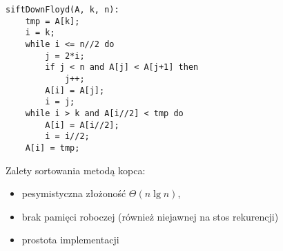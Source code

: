 \begin{verbatim}
siftDownFloyd(A, k, n):
    tmp = A[k];
    i = k;
    while i <= n//2 do
        j = 2*i;
        if j < n and A[j] < A[j+1] then
            j++;
        A[i] = A[j];
        i = j;
    while i > k and A[i//2] < tmp do
        A[i] = A[i//2];
        i = i//2;
    A[i] = tmp;
\end{verbatim}

Zalety sortowania metodą kopca:
\begin{itemize}
    \item pesymistyczna złożoność \( \Theta(n \lg n) \),
    \item brak pamięci roboczej (również niejawnej na stos rekurencji)
    \item prostota implementacji
\end{itemize}